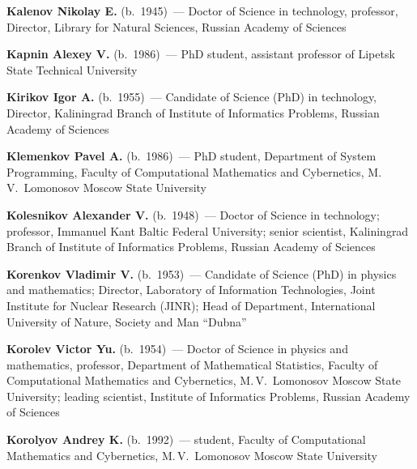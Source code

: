 \begin{multicols}{2}
\vspace*{4pt}

\noindent
\textbf{Kalenov Nikolay E.} (b.\ 1945)~--- Doctor of Science in technology, professor, 
Director, Library for Natural Sciences, Russian Academy of Sciences 

\vspace*{4pt}

\noindent
\textbf{Kapnin Alexey V.} (b.\ 1986)~--- PhD student, assistant professor of Lipetsk State 
Technical University


\vspace*{4pt}

\noindent \textbf{Kirikov Igor  A.} (b.\ 1955)~--- Candidate of Science (PhD) 
in technology, Director, Kaliningrad Branch of Institute of Informatics 
Problems, Russian Academy of Sciences 

\vspace*{4pt}

\noindent
\textbf{Klemenkov Pavel A.} (b.\ 1986)~--- PhD student, Department of  System Programming, 
Faculty of Computational Mathematics and Cybernetics, M.\,V.~Lomonosov Moscow State 
University


\vspace*{4pt}

\noindent
\textbf{Kolesnikov Alexander V.} (b.\ 1948)~--- Doctor of Science in technology; professor, 
Immanuel Kant Baltic Federal University; senior scientist, Kaliningrad Branch 
of Institute of Informatics Problems, Russian Academy of Sciences 

\columnbreak

\noindent
\textbf{Korenkov Vladimir V.} (b.\ 1953)~--- Candidate of Science (PhD) in physics and 
mathematics; Director, Laboratory of Information Technologies, Joint 
Institute for Nuclear Research (JINR); Head of Department, International 
University of Nature, Society and Man ``Dubna'' 

\vspace*{5.5pt}


\noindent
\textbf{Korolev Victor Yu.} (b.\ 1954)~--- Doctor of Science in physics and mathematics, 
professor, Department of Mathematical Statistics, Faculty of Computational 
Mathematics and Cybernetics, M.\,V.~Lomonosov Moscow State University; leading 
scientist, Institute of Informatics Problems, Russian Academy of Sciences

\vspace*{5.5pt}

\noindent
\textbf{Korolyov Andrey K.} (b.\ 1992)~--- student, Faculty of Computational Mathematics 
and Cybernetics, M.\,V.~Lomonosov Moscow State University


\end{multicols}
